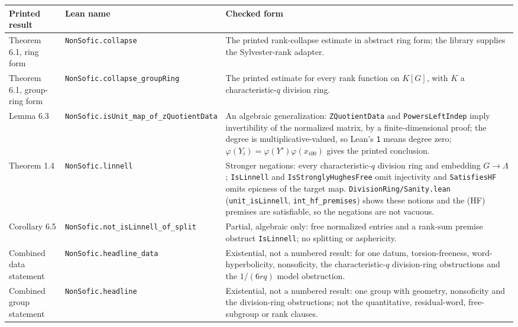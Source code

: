 \documentclass[11pt]{article}
\theoremstyle{definition}
\theoremstyle{remark}
\numberwithin{equation}{section}
\newcommand{\lean}[1]{\nolinkurl{#1}}
\begin{document}
\begin{center}\footnotesize
\begin{minipage}{\linewidth}
\setlength{\tabcolsep}{4pt}
\begin{tabular}{@{}>{\raggedright\arraybackslash}p{.16\linewidth}>{\raggedright\arraybackslash}p{.30\linewidth}>{\raggedright\arraybackslash}p{.48\linewidth}@{}}
\toprule Printed result & Lean name & Checked form\\\midrule
Theorem 6.1, ring form & \lean{NonSofic.collapse} & The printed rank-collapse estimate in abstract ring form; the library supplies the Sylvester-rank adapter.\\[4pt]
Theorem 6.1, group-ring form & \lean{NonSofic.collapse_groupRing} & The printed estimate for every rank function on $K[G]$, with $K$ a characteristic-$q$ division ring.\\[4pt]
Lemma 6.3 & \lean{NonSofic.isUnit_map_of_zQuotientData} & An algebraic generalization: \lean{ZQuotientData} and \lean{PowersLeftIndep} imply invertibility of the normalized matrix, by a finite-dimensional proof; the degree is multiplicative-valued, so Lean's \lean{1} means degree zero; $\varphi(Y_i)=\varphi(Y')\varphi(x_{i00})$ gives the printed conclusion.\\[4pt]
Theorem 1.4 & \lean{NonSofic.linnell} & Stronger negations: every characteristic-$q$ division ring and embedding $G\to\Lambda$; \lean{IsLinnell} and \lean{IsStronglyHughesFree} omit injectivity and \lean{SatisfiesHF} omits epicness of the target map. \lean{DivisionRing/Sanity.lean} (\lean{unit_isLinnell}, \lean{int_hf_premises}) shows these notions and the (HF) premises are satisfiable, so the negations are not vacuous.\\[4pt]
Corollary 6.5 & \lean{NonSofic.not_isLinnell_of_split} & Partial, algebraic only: free normalized entries and a rank-sum premise obstruct \lean{IsLinnell}; no splitting or asphericity.\\[4pt]
Combined data statement & \lean{NonSofic.headline_data} & Existential, not a numbered result: for one datum, torsion-freeness, word-hyperbolicity, nonsoficity, the characteristic-$q$ division-ring obstructions and the $1/(6rq)$ model obstruction.\\[4pt]
Combined group statement & \lean{NonSofic.headline} & Existential, not a numbered result: one group with geometry, nonsoficity and the division-ring obstructions; not the quantitative, residual-word, free-subgroup or rank clauses.\\
\bottomrule
\end{tabular}
\end{minipage}
\end{center}
\end{document}
